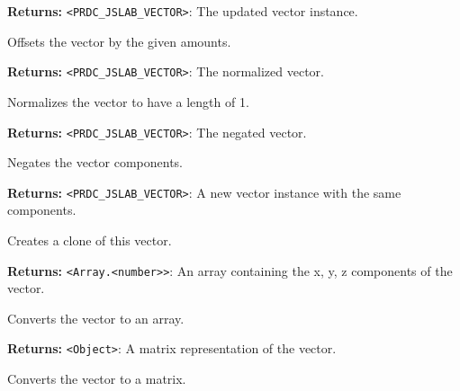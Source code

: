 \documentclass[12pt,a4paper]{article}
\begin{document}
\noindent \textbf{Returns:} \texttt{<PRDC\_JSLAB\_VECTOR>}: The updated vector instance.

\noindent Offsets the vector by the given amounts.

\vspace{5mm}
\noindent {}


\noindent \textbf{Returns:} \texttt{<PRDC\_JSLAB\_VECTOR>}: The normalized vector.

\noindent Normalizes the vector to have a length of 1.

\vspace{5mm}
\noindent {}


\noindent \textbf{Returns:} \texttt{<PRDC\_JSLAB\_VECTOR>}: The negated vector.

\noindent Negates the vector components.

\vspace{5mm}
\noindent {}


\noindent \textbf{Returns:} \texttt{<PRDC\_JSLAB\_VECTOR>}: A new vector instance with the same components.

\noindent Creates a clone of this vector.

\vspace{5mm}
\noindent {}


\noindent \textbf{Returns:} \texttt{<Array.<number>>}: An array containing the x, y, z components of the vector.

\noindent Converts the vector to an array.

\vspace{5mm}
\noindent {}


\noindent \textbf{Returns:} \texttt{<Object>}: A matrix representation of the vector.

\noindent Converts the vector to a matrix.
\end{document}
